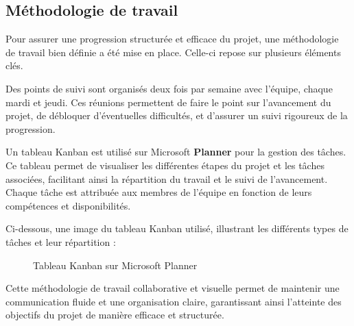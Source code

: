 \subsection{Méthodologie de travail}
Pour assurer une progression structurée et efficace du projet, une méthodologie de travail bien définie a été mise en place. Celle-ci repose sur plusieurs éléments clés. 

Des points de suivi sont organisés deux fois par semaine avec l'équipe, chaque mardi et jeudi. Ces réunions permettent de faire le point sur l'avancement du projet, de débloquer d'éventuelles difficultés, et d'assurer un suivi rigoureux de la progression.

Un tableau Kanban est utilisé sur Microsoft \textbf{Planner} pour la gestion des tâches. Ce tableau permet de visualiser les différentes étapes du projet et les tâches associées, facilitant ainsi la répartition du travail et le suivi de l'avancement. Chaque tâche est attribuée aux membres de l'équipe en fonction de leurs compétences et disponibilités.

Ci-dessous, une image du tableau Kanban utilisé, illustrant les différents types de tâches et leur répartition :

\begin{figure}[H]
    \begin{center}
        \caption{Tableau Kanban sur Microsoft Planner}
    \end{center}
\end{figure}

Cette méthodologie de travail collaborative et visuelle permet de maintenir une communication fluide et une organisation claire, garantissant ainsi l'atteinte des objectifs du projet de manière efficace et structurée.

